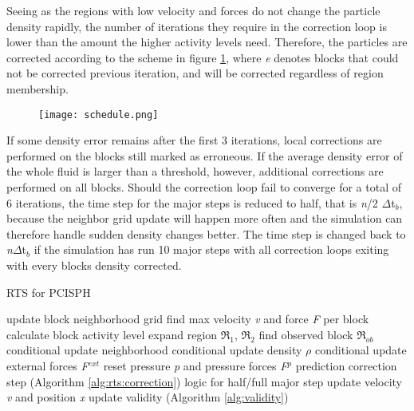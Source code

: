 \documentclass[../../main.tex]{subfiles}
\begin{document}
Seeing as the regions with low velocity and forces do not change the particle density rapidly, the number of iterations they require in the correction loop is lower than the amount the higher activity levels need. Therefore, the particles are corrected according to the scheme in figure \ref{fig:schedule}, where \textit{e} denotes blocks that could not be corrected previous iteration, and will be corrected regardless of region membership. 

\begin{figure}[h!]
    \centering
    \texttt{[image: schedule.png]}
    \caption{ }
    \label{fig:schedule}
\end{figure}

If some density error remains after the first 3 iterations, local corrections are performed on the blocks still marked as erroneous. If the average density error of the whole fluid is larger than a threshold, however, additional corrections are performed on all blocks. Should the correction loop fail to converge for a total of 6 iterations, the time step for the major steps is reduced to half, that is \textit{n}/2 $\Delta$t$_b$, because the neighbor grid update will happen more often and the simulation can therefore handle sudden density changes better. The time step is changed back to \textit{n}$\Delta$t$_b$ if the simulation has run 10 major steps with all correction loops exiting with every blocks density corrected. 


\begin{algorithm}[]
    \caption{RTS for PCISPH}
    \label{alg:rts:pcisph}
    \begin{algorithmic}[1]
            \State update block neighborhood grid
            \State find max velocity \textit{v} and force \textit{F} per block
            \State calculate block activity level
            \State expand region $\Re_1$, $\Re_2$
            \State find observed block $\Re_{ob}$
                \State conditional update neighborhood
                \State conditional update density $\rho$
                \State conditional update external forces \textit{F}$^{ext}$
                \State reset pressure \textit{p} and pressure forces \textit{F}$^p$
                \State prediction correction step (Algorithm \ref{alg:rts:correction})
                \State logic for half/full major step
                \State update velocity \textit{v} and position \textit{x}
                \State update validity (Algorithm \ref{alg:validity})
            \EndFor
        \EndWhile
   \end{algorithmic}
\end{algorithm}
\end{document}
